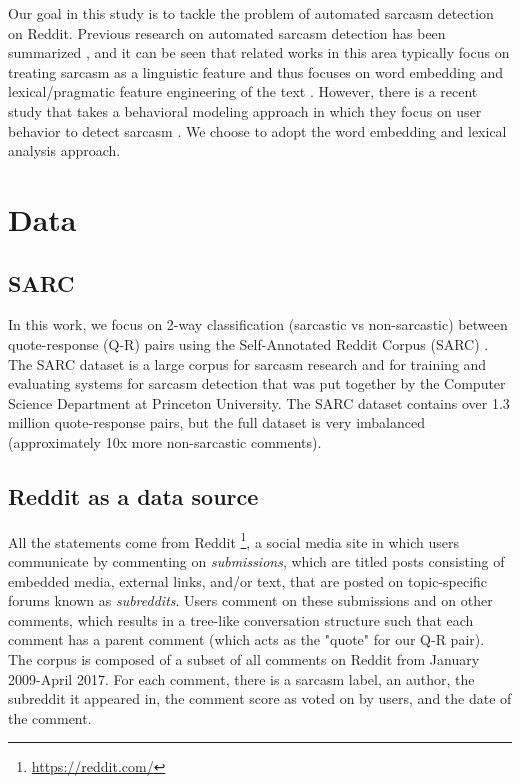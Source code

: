 \documentclass{article}
\begin{document}
Our goal in this study is to tackle the problem of automated sarcasm detection on Reddit. Previous research on automated sarcasm detection has been summarized \citep{joshi2016automatic}, and it can be seen that related works in this area typically focus on treating sarcasm as a linguistic feature and thus focuses on word embedding and lexical/pragmatic feature engineering of the text \citep{tsur2010icwsm, riloff2013sarcasm, liebrecht2013perfect, gonzalez2011identifying}. However, there is a recent study that takes a behavioral modeling approach in which they focus on user behavior to detect sarcasm \citep{rajadesingan2015sarcasm}. We choose to adopt the word embedding and lexical analysis approach. 

\section{Data}

\subsection{SARC}
In this work, we focus on 2-way classification (sarcastic vs non-sarcastic) between quote-response (Q-R) pairs using the Self-Annotated Reddit Corpus (SARC) \citep{khodak2017large}. The SARC dataset is a large corpus for sarcasm research and for training and evaluating systems for sarcasm detection that was put together by the Computer Science Department at Princeton University. The SARC dataset contains over 1.3 million quote-response pairs, but the full dataset is very imbalanced (approximately 10x more non-sarcastic comments). 

\subsection{Reddit as a data source}
All the statements come from Reddit \footnote{\url{https://reddit.com/}}, a social media site in which users communicate by commenting on \textit{submissions}, which are titled posts consisting of embedded media, external links, and/or text, that are posted on topic-specific forums known as \textit{subreddits}. Users comment on these submissions and on other comments, which results in a tree-like conversation structure such that each comment has a parent comment (which acts as the "quote" for our Q-R pair). The corpus is composed of a subset of all comments on Reddit from January 2009-April 2017. For each comment, there is a sarcasm label, an author, the subreddit it appeared in, the comment score as voted on by users, and the date of the comment. 
\end{document}
